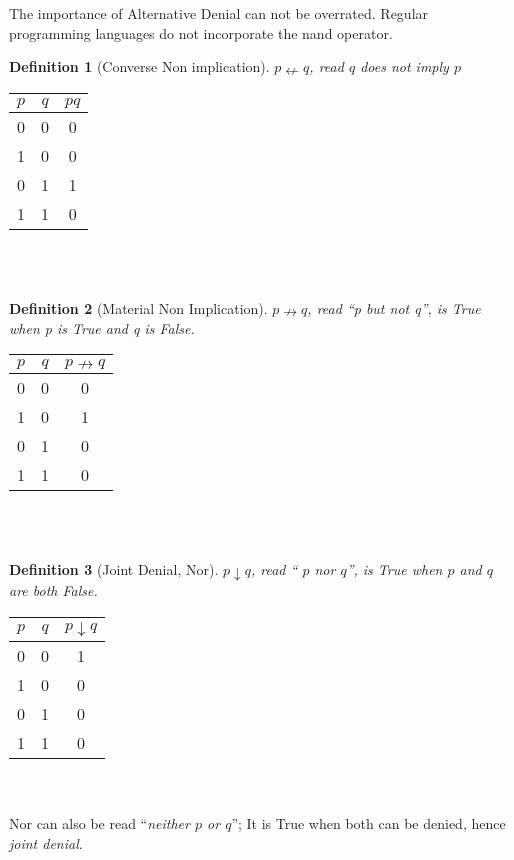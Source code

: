 \documentclass[10pt,a4paper,draft,titlepage,onecolumn]{book}
\newtheorem{definition}{Definition}[section]
\begin{document}
The importance of Alternative Denial can not be overrated. 
Regular programming languages do not incorporate the nand operator. 




\begin{definition}[Converse Non implication]$p{\nleftarrow}q$, read $q$ does not imply $p$ 
\end{definition}  
\begin{tabular}{ |c|c|c| }
 \hline
   $p$ & $q$ &  $p q$  \\
 \hline
 0 & 0 & 0 \\
 1 & 0 & 0\\
 0 & 1 & 1\\
 1 & 1 & 0\\
 \hline
\end{tabular}\\\\






\begin{definition}[Material Non Implication]$p{\nrightarrow}q$, read ``p but not q'', is True when p is True and q is False.
\end{definition}
\begin{tabular}{ |c|c|c| }
 \hline
 $p$ & $q$ & $p{\nrightarrow}q$  \\
 \hline
 0 & 0 & 0 \\
 1 & 0 & 1\\
 0 & 1 & 0\\
 1 & 1 & 0\\
 \hline
\end{tabular}\\\\



\begin{definition}[Joint Denial, Nor]$p{\downarrow}q$, read `` $p$ nor $q$'', is True when $p$ and $q$ are both False.
\end{definition}
\begin{tabular}{ |c|c|c| }
 \hline
   $p$ & $q$ &  $p{\downarrow}q$ \\
 \hline
 0 & 0 & 1 \\
 1 & 0 & 0\\
 0 & 1 & 0\\
 1 & 1 & 0\\
 \hline
\end{tabular}\\\\
Nor can also be read ``\textit{neither $p$ or $q$}''; It is True when both can be denied, hence \textit{joint denial}.\\
\end{document}
